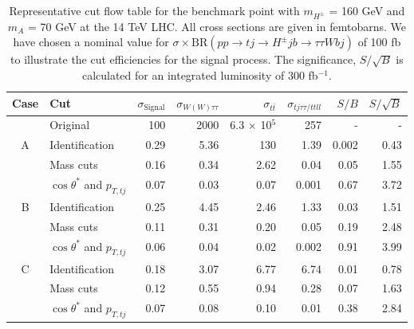 \begin{table}
\centering
\strictpagecheck
\begin{adjustwidth*}{0in}{-1.1in}
  \begin{tabular}{clrrrrrr}
    \toprule
 Case   & Cut                           & $\sigma_\text{Signal}$ & $\sigma_{W(W)\tau\tau}$ & $\sigma_{t\bar{t}}$ & $\sigma_{tj\tau\tau/ttll}$ & $S/B$ & $S/\sqrt{B}$\\\midrule
        &  Original                             & 100                    & 2000                    & 6.3 $\times$ 10$^5$ & 257                        & -     & -	\\\midrule
    A   & Identification                & 0.29                   & 5.36                    & 130                 & 1.39                       & 0.002 & 0.43	\\
        & Mass cuts                     & 0.16                   & 0.34                    & 2.62                & 0.04                       & 0.05  & 1.55	\\
        & $\cos\theta^*$ and $p_{T,tj}$ & 0.07                   & 0.03                    & 0.07                & 0.001                      & 0.67  & 3.72	\\\midrule
    B   & Identification                & 0.25                   & 4.45                    & 2.46                & 1.33                       & 0.03  & 1.51	\\
        & Mass cuts                     & 0.11                   & 0.31                    & 0.20                & 0.05                       & 0.19  & 2.48	\\
        & $\cos\theta^*$ and $p_{T,tj}$ & 0.06                   & 0.04                    & 0.02                & 0.002                      & 0.91  & 3.99	\\\midrule
    C   & Identification                & 0.18                   & 3.07                    & 6.77                & 6.74                       & 0.01  & 0.78 \\
        & Mass cuts                     & 0.12                   & 0.55                    & 0.94                & 0.28                       & 0.07  & 1.63 \\
        & $\cos\theta^*$ and $p_{T,tj}$ & 0.07                   & 0.08                    & 0.10                & 0.01                       & 0.38  & 2.84 \\
\bottomrule
\end{tabular}
\caption{Representative cut flow table for the benchmark point with $m_{H^{\pm}}$ = 160 GeV and $m_A$ = 70 GeV at the 14 TeV LHC. All cross sections are given in femtobarns. We have chosen a nominal value for $\sigma \times \text{BR}(pp \rightarrow tj \rightarrow H^{\pm} j b \rightarrow \tau\tau W b j )$ of 100 fb to illustrate the cut efficiencies for the signal process. The significance, $S/\sqrt{B}$ is calculated for an integrated luminosity of 300 fb$^{-1}$.}
\label{tab:tj}
\end{adjustwidth*}
\end{table}

